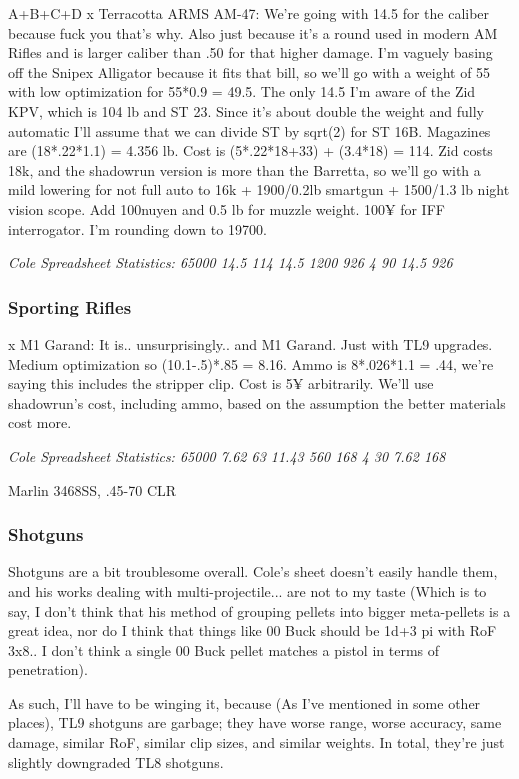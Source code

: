 \begin{multicols*}{2}
	A+B+C+D
	x Terracotta ARMS AM-47:  We're going with 14.5 for the caliber because fuck you that's why. Also just because it's a round used in modern AM Rifles and is larger caliber than .50 for that higher damage. I'm vaguely basing off the Snipex Alligator because it fits that bill, so we'll go with a weight of 55 with low optimization for 55*0.9 = 49.5. The only 14.5 I'm aware of the \GURPS Zid KPV, which is 104 lb and ST 23.  Since it's about double the weight and fully automatic I'll assume that we can divide ST by sqrt(2)  for ST 16B. Magazines are (18*.22*1.1) =  4.356 lb. Cost is (5*.22*18+33) + (3.4*18) = 114. Zid costs 18k,  and the shadowrun version is more than the Barretta, so we'll go with a mild lowering for not full auto to 16k + 1900/0.2lb smartgun + 1500/1.3 lb night vision scope. Add 100nuyen and 0.5 lb for muzzle weight. 100¥ for IFF interrogator. I'm rounding down to 19700.
	
	\textit{\textcolor{OliveGreen}{Cole Spreadsheet Statistics: 65000 14.5 114 14.5 1200 926 4 90 14.5 926}}

	\subsubsection{Sporting Rifles}
	
	x M1 Garand: It is.. unsurprisingly.. and M1 Garand. Just with TL9 upgrades. Medium optimization so (10.1-.5)*.85 = 8.16. Ammo is 8*.026*1.1 = .44, we're saying this includes the stripper clip. Cost is 5¥ arbitrarily. We'll use shadowrun's cost, including ammo, based on the assumption the better materials cost more.
	
	\textit{\textcolor{OliveGreen}{Cole Spreadsheet Statistics: 65000 7.62 63 11.43 560 168 4 30 7.62 168}}
	
	
	Marlin 3468SS, .45-70 CLR
	
	
	\subsubsection{Shotguns}
	
	Shotguns are a bit troublesome overall. Cole's sheet doesn't easily handle them, and his works dealing with multi-projectile... are not to my taste (Which is to say, I don't think that his method of grouping pellets into bigger meta-pellets is a great idea, nor do I think that things like 00 Buck should be 1d+3 pi with RoF 3x8.. I don't think a single 00 Buck pellet matches a pistol in terms of penetration). 
	
	As such, I'll have to be winging it, because (As I've mentioned in some other places), TL9 shotguns are garbage; they have worse range, worse accuracy, same damage, similar RoF, similar clip sizes, and similar weights. In total, they're just slightly downgraded TL8 shotguns. 
	

\end{multicols*}
